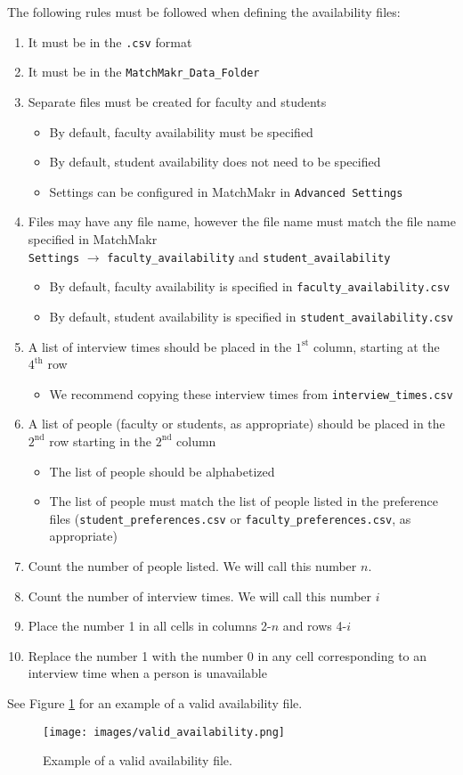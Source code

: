 The following rules must be followed when defining the availability files:
\begin{enumerate}
	\item It must be in the \texttt{.csv} format
	\item It must be in the \texttt{MatchMakr\_Data\_Folder}
	\item Separate files must be created for faculty and students
		\begin{itemize}
			\item By default, faculty availability must be specified
			\item By default, student availability does not need to be specified
			\item Settings can be configured in MatchMakr in \texttt{Advanced Settings}
		\end{itemize}
	\item Files may have any file name, however the file name must match the file name specified in MatchMakr \\ \texttt{Settings} $\rightarrow$ \texttt{faculty\_availability} and \texttt{student\_availability} 
		\begin{itemize}
			\item By default, faculty availability is specified in \texttt{faculty\_availability.csv}
			\item By default, student availability is specified in \texttt{student\_availability.csv}
		\end{itemize}
	\item A list of interview times should be placed in the $1^\text{st}$ column, starting at the $4^\text{th}$ row
		\begin{itemize}
			\item We recommend copying these interview times from \texttt{interview\_times.csv} 
		\end{itemize}
	\item A list of people (faculty or students, as appropriate) should be placed in the $2^\text{nd}$ row starting in the $2^\text{nd}$ column
		\begin{itemize}
			\item The list of people should be alphabetized
			\item The list of people must match the list of people listed in the preference files (\texttt{student\_preferences.csv} or \texttt{faculty\_preferences.csv}, as appropriate)
		\end{itemize}
	\item Count the number of people listed.  We will call this number $n$.
	\item Count the number of interview times.  We will call this number $i$
	\item Place the number 1 in all cells in columns 2-$n$ and rows 4-$i$
	\item Replace the number 1 with the number 0 in any cell corresponding to an interview time when a person is unavailable
\end{enumerate}

See Figure \ref{fig:valid_availability} for an example of a valid availability file.

\begin{figure}
	\centering
	\texttt{[image: images/valid\_availability.png]}
	\caption{\label{fig:valid_availability} Example of a valid availability file.}
\end{figure}


